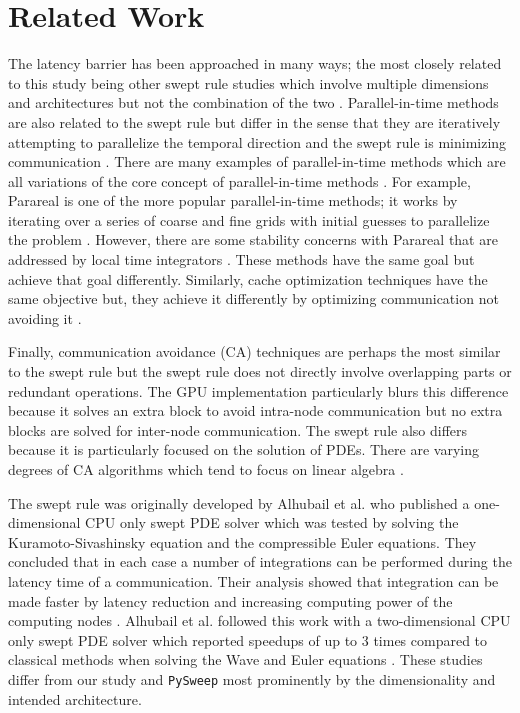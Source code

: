 \documentclass[review]{elsarticle}
\def\pysweep{\texttt{PySweep}}
\begin{document}
\section{Related Work}
\label{related-section}
\par The latency barrier has been approached in many ways; the most closely related to this study being other swept rule studies which involve multiple dimensions and architectures but not the combination of the two \cite{Alhubail2016ThePDEs,Alhubail2018ThePDEs,Magee2018AcceleratingDecomposition,Magee2020ApplyingSystems}. Parallel-in-time methods are also related to the swept rule but differ in the sense that they are iteratively attempting to parallelize the temporal direction and the swept rule is minimizing communication \cite{Gander201550Integration}. There are many examples of parallel-in-time methods which are all variations of the core concept of parallel-in-time methods \cite{Falgout2014ParallelMultigrid,Lions2013Resolution,Maday2020AnAlgorithm,Wu2018Parareal,EmmettTowardEquations,MinionINTERWEAVINGMULTIGRID,Hahne2020PyMGRIT:MGRIT}. For example, Parareal is one of the more popular parallel-in-time methods; it works by iterating over a series of coarse and fine grids with initial guesses to parallelize the problem \cite{Lions2013Resolution}. However, there are some stability concerns with Parareal that are addressed by local time integrators \cite{Wu2018Parareal}. These methods have the same goal but achieve that goal differently. Similarly, cache optimization techniques have the same objective but, they achieve it differently by optimizing communication not avoiding it \cite{Kowarschik2003AnAlgorithms}.

\par
 Finally, communication avoidance (CA) techniques are perhaps the most similar to the swept rule but the swept rule does not directly involve overlapping parts or redundant operations. The GPU implementation particularly blurs this difference because it solves an extra block to avoid intra-node communication but no extra blocks are solved for inter-node communication. The swept rule also differs because it is particularly focused on the solution of PDEs. There are varying degrees of CA algorithms which tend to focus on linear algebra \cite{DemmelAvoidingComputations, Ballard2011MinimizingAlgebra,BaboulinAMachines,Khabou2012LUVersion,SolomonikAHoefler}. 

\par
The swept rule was originally developed by Alhubail et al. who published a one-dimensional CPU only swept PDE solver which was tested by solving the Kuramoto-Sivashinsky equation and the compressible Euler equations. They concluded that in each case a number of integrations can be performed during the latency time of a communication. Their analysis showed that integration can be made faster by latency reduction and increasing computing power of the computing nodes \cite{Alhubail2016ThePDEs}. Alhubail et al. followed this work with a two-dimensional CPU only swept PDE solver which reported speedups of up to 3 times compared to classical methods when solving the Wave and Euler equations \cite{Alhubail2018ThePDEs}. These studies differ from our study and \pysweep{} most prominently by the dimensionality and intended architecture.
\end{document}
